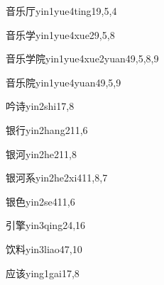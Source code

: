 \begin{verbete}{音乐厅}{yin1yue4ting1}{9,5,4}
\end{verbete}

\begin{verbete}{音乐学}{yin1yue4xue2}{9,5,8}
\end{verbete}

\begin{verbete}{音乐学院}{yin1yue4xue2yuan4}{9,5,8,9}
\end{verbete}

\begin{verbete}{音乐院}{yin1yue4yuan4}{9,5,9}
\end{verbete}

\begin{verbete}{吟诗}{yin2shi1}{7,8}
\end{verbete}

\begin{verbete}{银行}{yin2hang2}{11,6}
\end{verbete}

\begin{verbete}{银河}{yin2he2}{11,8}
\end{verbete}

\begin{verbete}{银河系}{yin2he2xi4}{11,8,7}
\end{verbete}

\begin{verbete}{银色}{yin2se4}{11,6}
\end{verbete}

\begin{verbete}{引擎}{yin3qing2}{4,16}
\end{verbete}

\begin{verbete}{饮料}{yin3liao4}{7,10}
\end{verbete}

\begin{verbete}{应该}{ying1gai1}{7,8}
\end{verbete}

